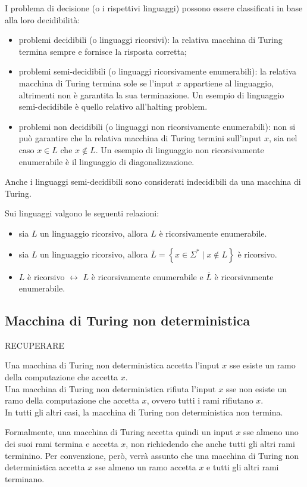 I problema di decisione (o i rispettivi linguaggi) possono essere classificati in base alla loro decidibilità:
\begin{itemize}
    \item problemi decidibili (o linguaggi ricorsivi): la relativa macchina di Turing termina sempre e fornisce la risposta corretta;
    \item problemi semi-decidibili (o linguaggi ricorsivamente enumerabili): la relativa macchina di Turing termina sole se l'input $x$ appartiene al linguaggio, altrimenti non è garantita la sua terminazione. Un esempio di linguaggio semi-decidibile è quello relativo all'halting problem.
    \item problemi non decidibili (o linguaggi non ricorsivamente enumerabili): non si può garantire che la relativa macchina di Turing termini sull'input $x$, sia nel caso $x \in L$ che $x \notin L$. Un esempio di linguaggio non ricorsivamente enumerabile è il linguaggio di diagonalizzazione.
\end{itemize}
Anche i linguaggi semi-decidibili sono considerati indecidibili da una macchina di Turing.

Sui linguaggi valgono le seguenti relazioni:
\begin{itemize}
    \item sia $L$ un linguaggio ricorsivo, allora $L$ è ricorsivamente enumerabile.
    \item sia $L$ un linguaggio ricorsivo, allora $\overline{L} = \left\{ x \in \Sigma^* \; | \; x \notin L \right\}$ è ricorsivo.
    \item $L$ è ricorsivo $\leftrightarrow$ $L$ è ricorsivamente enumerabile e $\overline{L}$ è ricorsivamente enumerabile.
\end{itemize}

\subsection*{Macchina di Turing non deterministica}
RECUPERARE

Una macchina di Turing non deterministica accetta l'input $x$ sse esiste un ramo della computazione che accetta $x$.\\
Una macchina di Turing non deterministica rifiuta l'input $x$ sse non esiste un ramo della computazione che accetta $x$, ovvero tutti i rami rifiutano $x$.\\
In tutti gli altri casi, la macchina di Turing non deterministica non termina.

Formalmente, una macchina di Turing accetta quindi un input $x$ sse almeno uno dei suoi rami termina e accetta $x$, non richiedendo che anche tutti gli altri rami terminino. Per convenzione, però, verrà assunto che una macchina di Turing non deterministica accetta $x$ sse almeno un ramo accetta $x$ e tutti gli altri rami terminano.

